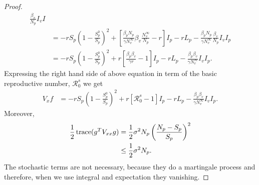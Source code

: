 \begin{proof}
\begin{align*}
			\frac{\beta_v}{N_p} I_vI
		\\
			&=
			- rS_p
			\left(
				1 - \frac{S_p^0}{S_p}
			\right) ^ 2 +
			\left[
				\frac{\beta_p N_p}{\gamma N^\infty_v}
				\beta_v
				\frac{N_v^\infty}{N_p} - r
			\right] I_p - 
			rL_p - 
			\frac{\beta_p N_p}{\gamma N ^ \infty_v}
			\frac{\beta_v}{N_p} I_v I_p
		\\
			&=
			-rS_p
			\left(
				1 - \frac{S_p^0}{S_p}
			\right) ^ 2 + 
			r
			\left[
				\frac{\beta_p \beta_v}{\gamma r} - 1 
			\right] I_p - 
			r L_p - 
			\frac{\beta_p \beta_v}{\gamma N ^ \infty_v} I_v I_p.
	\end{align*}
	Expressing the right hand side of above equation in term of the basic 
	reproductive number, $\mathcal{R}^s_0$ we get
	\begin{align*}
		V_x f &=
			-r S_p
			\left(
				1 - \frac{S_p^0}{S_p}
			\right) ^ 2 + 
			r
			\left[
				\mathcal{R} ^ s_0 - 1
			\right]I_p - 
			r L_p - 
			\frac{\beta_p \beta_v}{\gamma N ^ \infty_v} I_v I_p.
	\end{align*}
%
	Moreover,
	\begin{align*}
		\frac{1}{2}
		\operatorname{trace}(g^TV_{xx}g) 
			&=
				\frac{1}{2} 
				\sigma^2 N_p 
				\left(
					\frac{N_p - S_p}{S_p}
				\right) ^ 2
			\\
			&\leq
				\frac{1}{2} 
				\sigma^2 N_p.
	\end{align*}
	The stochastic terms are not necessary, because they do a martingale 
	process and therefore, when we use integral and expectation they vanishing.
	

\end{proof}
